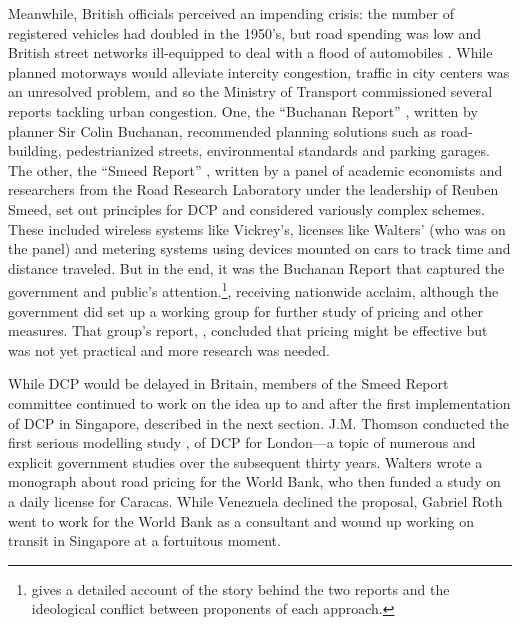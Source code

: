 Meanwhile, British officials perceived an impending crisis: the number of registered vehicles had doubled in the 1950's, but road spending was low and British street networks ill-equipped to deal with a flood of automobiles \citep{Gunn2011,Hall2004}. While planned motorways would alleviate intercity congestion, traffic in city centers was an unresolved problem, and so the Ministry of Transport commissioned several reports tackling urban congestion. One, the ``Buchanan Report'' \citep{MoT1963}, written by planner Sir Colin Buchanan, recommended planning solutions such as road-building, pedestrianized streets, environmental standards and parking garages. The other, the ``Smeed Report'' \citep{MoT1964}, written by a panel of academic economists and researchers from the Road Research Laboratory under the leadership of Reuben Smeed, set out principles for DCP and considered variously complex schemes. These included wireless systems like Vickrey's, licenses like Walters' (who was on the panel) and metering systems using devices mounted on cars to track time and distance traveled. But in the end, it was the Buchanan Report that captured the government and public's attention.\footnote{\citet{Rooney2014} gives a detailed account of the story behind the two reports and the ideological conflict between proponents of each approach.}, receiving nationwide acclaim, although the government did set up a working group for further study of pricing and other measures.  That group's report, \citet{MoT1967}, concluded that pricing might be effective but was not yet practical and more research was needed.

While DCP would be delayed in Britain, members of the Smeed Report committee continued to work on the idea up to and after the first implementation of DCP in Singapore, described in the next section. J.M. Thomson conducted the first serious modelling study \citep{Thomson1967a}, of DCP for London---a topic of numerous and explicit government studies over the subsequent thirty years. Walters wrote a monograph \citet{Walters1968} about road pricing for the World Bank, who then funded a study \citet{Vorhees1973} on a daily license for Caracas. While Venezuela declined the proposal, Gabriel Roth went to work for the World Bank as a consultant and wound up working on transit in Singapore at a fortuitous moment.
